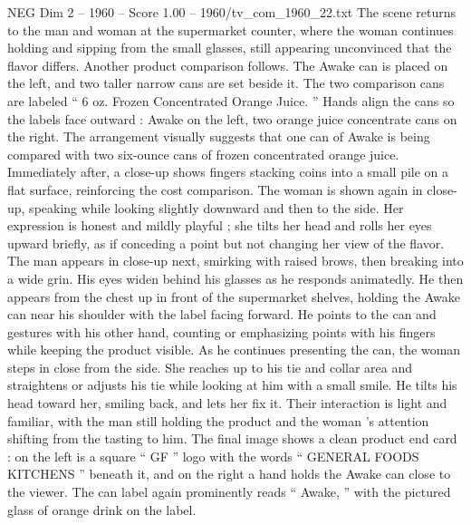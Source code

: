\begin{textsample}{NEG Dim 2 – 1960 – Score 1.00 – 1960/tv\_com\_1960\_22.txt}
The scene returns to the man and woman at the supermarket counter, where the woman continues holding and sipping from the small glasses, still appearing unconvinced that the flavor differs.
Another product comparison follows.
The Awake can is placed on the left, and two taller narrow cans are set beside it.
The two comparison cans are labeled “ 6 oz.
Frozen Concentrated Orange Juice. ” Hands align the cans so the labels face outward : Awake on the left, two orange juice concentrate cans on the right.
The arrangement visually suggests that one can of Awake is being compared with two six-ounce cans of frozen concentrated orange juice.
Immediately after, a close-up shows fingers stacking coins into a small pile on a flat surface, reinforcing the cost comparison.
The woman is shown again in close-up, speaking while looking slightly downward and then to the side.
Her expression is honest and mildly playful ; she tilts her head and rolls her eyes upward briefly, as if conceding a point but not changing her view of the flavor.
The man appears in close-up next, smirking with raised brows, then breaking into a wide grin.
His eyes widen behind his glasses as he responds animatedly.
He then appears from the chest up in front of the supermarket shelves, holding the Awake can near his shoulder with the label facing forward.
He points to the can and gestures with his other hand, counting or emphasizing points with his fingers while keeping the product visible.
As he continues presenting the can, the woman steps in close from the side.
She reaches up to his tie and collar area and straightens or adjusts his tie while looking at him with a small smile.
He tilts his head toward her, smiling back, and lets her fix it.
Their interaction is light and familiar, with the man still holding the product and the woman ’s attention shifting from the tasting to him.
The final image shows a clean product end card : on the left is a square “ GF ” logo with the words “ GENERAL FOODS KITCHENS ” beneath it, and on the right a hand holds the Awake can close to the viewer.
The can label again prominently reads “ Awake, ” with the pictured glass of orange drink on the label.

\end{textsample}
